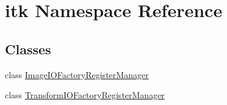 \hypertarget{namespaceitk}{}\section{itk Namespace Reference}
\label{namespaceitk}
\subsection*{Classes}
\begin{DoxyCompactItemize}
\item 
class \hyperlink{classitk_1_1_image_i_o_factory_register_manager}{Image\+I\+O\+Factory\+Register\+Manager}
\item 
class \hyperlink{classitk_1_1_transform_i_o_factory_register_manager}{Transform\+I\+O\+Factory\+Register\+Manager}
\end{DoxyCompactItemize}
